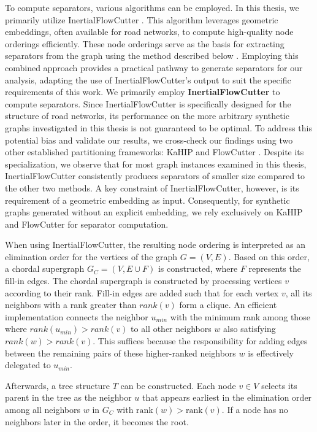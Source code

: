To compute separators, various algorithms can be employed.
In this thesis, we primarily utilize InertialFlowCutter \cite{gottesburen_faster_2019}.
This algorithm leverages geometric embeddings, often available for road networks, to compute high-quality node orderings efficiently.
These node orderings serve as the basis for extracting separators from the graph using the method described below \cite{blasius_customizable_2025}.
Employing this combined approach provides a practical pathway to generate separators for our analysis, adapting the use of InertialFlowCutter's output to suit the specific requirements of this work.
We primarily employ \textbf{InertialFlowCutter} \cite{gottesburen_faster_2019} to compute separators.
Since InertialFlowCutter is specifically designed for the structure of road networks, its performance on the more arbitrary synthetic graphs investigated in this thesis is not guaranteed to be optimal.
To address this potential bias and validate our results, we cross-check our findings using two other established partitioning frameworks: KaHIP \cite{sanders_think_2013} and FlowCutter \cite{hamann_graph_2018}.
Despite its specialization, we observe that for most graph instances examined in this thesis, InertialFlowCutter consistently produces separators of smaller size compared to the other two methods.
A key constraint of InertialFlowCutter, however, is its requirement of a geometric embedding as input.
Consequently, for synthetic graphs generated without an explicit embedding, we rely exclusively on KaHIP and FlowCutter for separator computation.

When using InertialFlowCutter, the resulting node ordering is interpreted as an elimination order for the vertices of the graph \( G = (V, E) \).
Based on this order, a chordal supergraph \( G_C = (V, E \cup F) \) is constructed, where \( F \) represents the fill-in edges.
The chordal supergraph is constructed by processing vertices \(v\) according to their rank.
Fill-in edges are added such that for each vertex \(v\), all its neighbors with a rank greater than \(rank(v)\) form a clique.
An efficient implementation connects the neighbor \(u_{min}\) with the minimum rank among those where \(rank(u_{min}) > rank(v)\) to all other neighbors \(w\) also satisfying \(rank(w) > rank(v)\).
This suffices because the responsibility for adding edges between the remaining pairs of these higher-ranked neighbors \(w\) is effectively delegated to \(u_{min}\).

Afterwards, a tree structure \(T\) can be constructed.
Each node \(v \in V\) selects its parent in the tree as the neighbor \(u\) that appears earliest in the elimination order among all neighbors \(w\) in \( G_C \) with \( \text{rank}(w) > \text{rank}(v) \).
If a node has no neighbors later in the order, it becomes the root.

